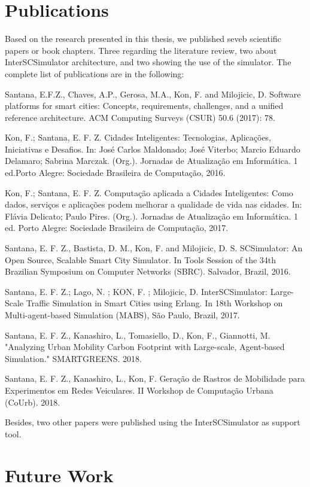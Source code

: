\section{Publications}
\label{sec:publicacoes}

Based on the research presented in this thesis, we published seveb scientific papers or book chapters. Three regarding the literature review, two about InterSCSimulator architecture, and two showing the use of the simulator. The complete list of publications are in the following:

Santana, E.F.Z., Chaves, A.P., Gerosa, M.A., Kon, F. and Milojicic, D. Software platforms for smart cities: Concepts, requirements, challenges, and a unified reference architecture. ACM Computing Surveys (CSUR) 50.6 (2017): 78.

Kon, F.; Santana, E. F. Z. Cidades Inteligentes: Tecnologias, Aplicações, Iniciativas e Desafios. In: José Carlos Maldonado; José Viterbo; Marcio Eduardo Delamaro; Sabrina Marczak. (Org.). Jornadas de Atualização em Informática. 1 ed.Porto Alegre: Sociedade Brasileira de Computação, 2016.

Kon, F.; Santana, E. F. Z. Computação aplicada a Cidades Inteligentes: Como dados, serviços e aplicações podem melhorar a qualidade de vida nas cidades. In: Flávia Delicato; Paulo Pires. (Org.). Jornadas de Atualização em Informática. 1 ed. Porto Alegre: Sociedade Brasileira de Computação, 2017.

Santana, E. F. Z., Bastista, D. M., Kon, F. and Milojicic, D. S. SCSimulator: An Open Source, Scalable Smart City Simulator. In Tools Session of the 34th Brazilian Symposium on Computer Networks (SBRC). Salvador, Brazil, 2016.

Santana, E. F. Z.; Lago, N. ; KON, F. ; Milojicic, D. InterSCSimulator: Large-Scale Traffic Simulation in Smart Cities using Erlang. In 18th Workshop on Multi-agent-based Simulation (MABS), São Paulo, Brazil, 2017.

Santana, E. F. Z., Kanashiro, L., Tomasiello, D., Kon, F., Giannotti, M. "Analyzing Urban Mobility Carbon Footprint with Large-scale, Agent-based Simulation." SMARTGREENS. 2018.

Santana, E. F. Z., Kanashiro, L., Kon, F. Geração de Rastros de Mobilidade para Experimentos em Redes Veiculares. II Workshop de Computação Urbana (CoUrb). 2018.

Besides, two other papers were published using the InterSCSimulator as support tool.


\section{Future Work}

